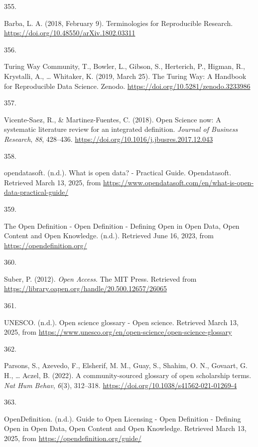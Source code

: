 \documentclass[
  11pt,
  letterpaper,
]{scrreprt}
\newlength{\cslhangindent}
\newlength{\csllabelwidth}
\newenvironment{CSLReferences}[2] %
 {\begin{list}{}{%
  \setlength{\itemindent}{0pt}
  \setlength{\leftmargin}{0pt}
  \setlength{\parsep}{0pt}
  \ifodd #1
   \setlength{\leftmargin}{\cslhangindent}
   \setlength{\itemindent}{-1\cslhangindent}
  \fi
  \setlength{\itemsep}{#2\baselineskip}}}
 {\end{list}}
\newcommand{\CSLLeftMargin}[1]{\parbox[t]{\csllabelwidth}{\strut#1\strut}}
\newcommand{\CSLRightInline}[1]{\parbox[t]{\linewidth - \csllabelwidth}{\strut#1\strut}}
\begin{document}
\begin{CSLReferences}{0}{0}
\CSLLeftMargin{355. }%
\CSLRightInline{Barba, L. A. (2018, February 9). Terminologies for
{Reproducible Research}.
\url{https://doi.org/10.48550/arXiv.1802.03311}}

\CSLLeftMargin{356. }%
\CSLRightInline{Turing Way Community, T., Bowler, L., Gibson, S.,
Herterich, P., Higman, R., Krystalli, A., \ldots{} Whitaker, K. (2019,
March 25). The {Turing Way}: {A Handbook} for {Reproducible Data
Science}. Zenodo. \url{https://doi.org/10.5281/zenodo.3233986}}

\CSLLeftMargin{357. }%
\CSLRightInline{Vicente-Saez, R., \& Martinez-Fuentes, C. (2018). Open
{Science} now: {A} systematic literature review for an integrated
definition. \emph{Journal of Business Research}, \emph{88}, 428--436.
\url{https://doi.org/10.1016/j.jbusres.2017.12.043}}

\CSLLeftMargin{358. }%
\CSLRightInline{opendatasoft. (n.d.). What is open data? - {Practical
Guide}. Opendatasoft. Retrieved March 13, 2025, from
\url{https://www.opendatasoft.com/en/what-is-open-data-practical-guide/}}

\CSLLeftMargin{359. }%
\CSLRightInline{The {Open Definition} - {Open Definition} - {Defining
Open} in {Open Data}, {Open Content} and {Open Knowledge}. (n.d.).
Retrieved June 16, 2023, from \url{https://opendefinition.org/}}

\CSLLeftMargin{360. }%
\CSLRightInline{Suber, P. (2012). \emph{Open {Access}}. The MIT Press.
Retrieved from
\url{https://library.oapen.org/handle/20.500.12657/26065}}

\CSLLeftMargin{361. }%
\CSLRightInline{UNESCO. (n.d.). Open science glossary - {Open} science.
Retrieved March 13, 2025, from
\url{https://www.unesco.org/en/open-science/open-science-glossary}}

\CSLLeftMargin{362. }%
\CSLRightInline{Parsons, S., Azevedo, F., Elsherif, M. M., Guay, S.,
Shahim, O. N., Govaart, G. H., \ldots{} Aczel, B. (2022). A
community-sourced glossary of open scholarship terms. \emph{Nat Hum
Behav}, \emph{6}(3), 312--318.
\url{https://doi.org/10.1038/s41562-021-01269-4}}

\CSLLeftMargin{363. }%
\CSLRightInline{OpenDefinition. (n.d.). Guide to {Open Licensing} -
{Open Definition} - {Defining Open} in {Open Data}, {Open Content} and
{Open Knowledge}. Retrieved March 13, 2025, from
\url{https://opendefinition.org/guide/}}


\end{CSLReferences}
\end{document}
